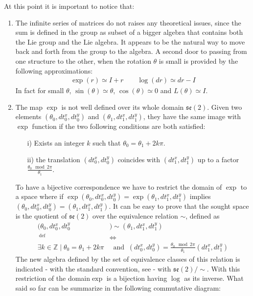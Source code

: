 At this point it is important to notice that: 
\begin{enumerate}
	\item The infinite series of matrices  do not raises any theoretical issues, since the sum is defined in the group as subset of a bigger algebra that contains both the Lie group and the Lie algebra. It appears to be the natural way to move back and forth from the group to the algebra. A second door to passing from one structure to the other, when the rotation $\theta$ is small is provided by the following approximations:
	\begin{align}\label{eq:small_rotation_matrices_approx}
	\exp(r) \simeq I + r
	\qquad 
	\log(dr) \simeq dr - I
	\end{align}
	In fact for small $\theta$, $\sin(\theta) \simeq \theta$, $\cos(\theta) \simeq 0 $ and $ L(\theta) \simeq I$.
	\item The map $\exp$ is not well defined over its whole domain $\mathfrak{se}(2)$. Given two elements $(\theta_0, dt^{x}_0, dt^{y}_0)$ and $(\theta_1, dt^{x}_1, dt^{y}_1)$, they have the same image with $\exp$ function if the two following conditions are both satisfied:
	\begin{enumerate}
		\item[i)] Exists an integer $k$ such that $\theta_0 = \theta_1 + 2k\pi$.
		\item[ii)] the translation $(dt^{x}_0, dt^{y}_0)$ coincides with $(dt^{x}_1, dt^{y}_1)$ up to a factor $\frac{\theta_0 \mod 2\pi}{\theta_1}$.
	\end{enumerate}
	To have a bijective correspondence we have to restrict the domain of $\exp$ to a space where if $\exp(\theta_0, dt^{x}_0,dt^{y}_0) = \exp(\theta_1, dt^{x}_1, dt^{y}_1)$ implies  $(\theta_0, dt^{x}_0, dt^{y}_0) = (\theta_1, dt^{x}_1, dt^{y}_1)$.
	It can be easy to prove that the sought space is the quotient of $\mathfrak{se}(2)$ over the equivalence relation $\sim$, defined as 
	\begin{align*}
		(\theta_0, dt^{x}_0, dt^{y}_0 & ) \sim (\theta_1, dt^{x}_1, dt^{y}_1)
		\\
		~^{\text{def}}&\iff
		\\
		\exists k\in\mathbb{Z} \mid \theta_0 = \theta_1 + 2k\pi 
		&~\text{ and }~
		(dt^{x}_0, dt^{y}_0) = \frac{\theta_0 \mod 2\pi}{\theta_1}(dt^{x}_1, dt^{y}_1)
	\end{align*}
	The new algebra defined by the set of equivalence classes of this relation is indicated - with the standard convention, see \cite{artin2011algebra} - with $\mathfrak{se}(2)/\sim$. With this restriction of the domain$\exp$ is a bijection having $\log$ as its inverse.
	What said so far can be summarize in the following commutative diagram:
	

\end{enumerate}
